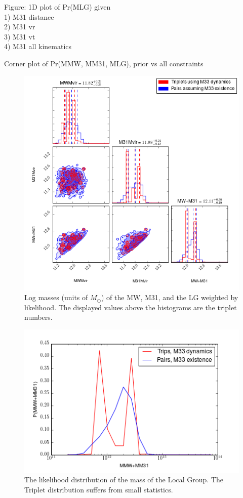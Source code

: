 \documentclass[iop,apj]{emulateapj}
\begin{document}
Figure: 1D plot of Pr(MLG) given \\
  1) M31 distance\\
  2) M31 vr\\
  3) M31 vt\\
  4) M31 all kinematics

Corner plot of Pr(MMW, MM31, MLG), prior vs all constraints

\begin{figure}
\includegraphics[width=\linewidth]{plots/res_plot.png}
  \caption{Log masses (units of $M_{\odot}$) of the MW, M31, and the LG weighted by likelihood. The displayed values above the histograms are the triplet numbers.}
  \label{fig:res_plot}
\end{figure}

\begin{figure}
\includegraphics[width=\linewidth]{plots/pdf_lg_plot.png}
  \caption{The likelihood distribution of the mass of the Local Group. The Triplet distribution suffers from small statistics.}
  \label{fig:lg_pdf}
\end{figure}
\end{document}
